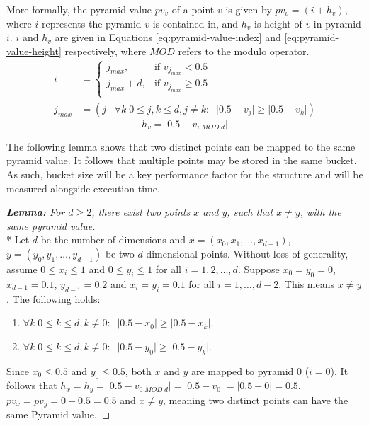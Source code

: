 More formally, the pyramid value $pv_v$ of a point $v$ is given by $pv_v = (i + h_v)$, where $i$ represents the pyramid $v$ is contained in, and $h_v$ is height of $v$ in pyramid $i$. $i$ and $h_v$ are given in Equations \ref{eq:pyramid-value-index} and \ref{eq:pyramid-value-height} respectively, where $MOD$ refers to the modulo operator.
\begin{align}
	i &= \begin{cases}
		j_{max},         & \text{if }v_{j_{max}} < 0.5\\
		j_{max} + d,   & \text{if }v_{j_{max}} \geq 0.5\\
	\end{cases}
	\label{eq:pyramid-value-index}
	\\
	j_{max} &= \left( j \;|\; \forall k \; 0 \leq j,k \leq d, j \neq k: \;\; \lvert 0.5 - v_j \rvert \geq \lvert 0.5 - v_k \rvert \right) \nonumber
\end{align}
\begin{equation}
	h_v = \lvert 0.5 - v_{i \; MOD \; d} \rvert
	\label{eq:pyramid-value-height}
\end{equation}

The following lemma shows that two distinct points can be mapped to the same pyramid value. It follows that multiple points may be stored in the same bucket. As such, bucket size will be a key performance factor for the structure and will be measured alongside execution time.

\begin{proof}[\textbf{Lemma: } For $d \geq 2$, there exist two points $x$ and $y$, such that $x \neq y$, with the same pyramid value]\mbox{}\\*
Let $d$ be the number of dimensions and $x = (x_0, x_1, \dots, x_{d -1})$, $y = (y_0, y_1, \dots, y_{d - 1})$ be two $d$-dimensional points. Without loss of generality, assume $0 \leq x_i \leq 1$ and $0 \leq y_i \leq 1$ for all $i = 1, 2, \dots, d$. Suppose $x_0 = y_0 = 0$, $x_{d - 1} = 0.1$, $y_{d - 1} = 0.2$ and $x_i = y_i = 0.1$ for all $i = 1, \dots, {d - 2}$. This means $x \neq y$. The following holds:
\begin{enumerate}
	\item $\forall k \; 0 \leq k \leq d, k \neq 0: \;\; \lvert 0.5 - x_0 \rvert \geq \lvert 0.5 - x_k \rvert$,
	\item $\forall k \; 0 \leq k \leq d, k \neq 0: \;\; \lvert 0.5 - y_0 \rvert \geq \lvert 0.5 - y_k \rvert$.
\end{enumerate}
Since $x_0 \leq 0.5$ and $y_0 \leq 0.5$, both $x$ and $y$ are mapped to pyramid 0 ($i = 0$). It follows that $h_x = h_y = \lvert 0.5 - v_{0 \; MOD \; d} \rvert = \lvert 0.5 - v_{0} \rvert = \lvert 0.5 - 0 \rvert = 0.5$. $pv_x = pv_y = 0 + 0.5 = 0.5$ and $x \neq y$, meaning two distinct points can have the same Pyramid value.

\end{proof}

